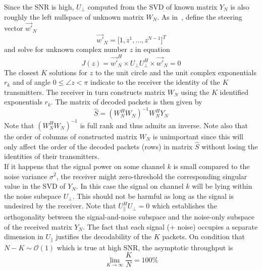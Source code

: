 \documentclass[10pt, a4paper, twocolumn]{IEEEtran}
\begin{document}
\noindent Since the SNR is high, $U_{\bot}$ computed from the SVD of known matrix $Y_N$ is also roughly the left nullspace of unknown matrix $W_N$. As in~\cite{music}, define the steering vector $\overrightarrow{w'}_N$
\begin{equation}
\label{z_steer}
\overrightarrow{w'}_N = \big[1, z^{1}, \dots, z^{N-1}\big]^T
\end{equation}  
\noindent and solve for unknown complex number $z$ in equation
\begin{equation}
J(z) = \overrightarrow{w'}_N^H\times U_{\bot} U_{\bot}^H\times \overrightarrow{w'}_N = 0
\end{equation}
\noindent The closest $K$ solutions for $z$ to the unit circle and the unit complex exponentials $r_k$ and of angle $0\leq \angle z < \pi$ indicate to the receiver the identity of the $K$ transmitters. The receiver in turn constructs matrix $W_N$ using the $K$ identified exponentials $r_k$. The matrix of decoded packets is then given by
\begin{equation}
\hat{S} = (W_N^H W_N)^{-1} W_N^H Y_N
\end{equation}
\noindent Note that $(W_N^H W_N)^{-1}$ is full rank and thus admits an inverse. Note also that the order of columns of constructed matrix $W_N$ is unimportant since this will only affect the order of the decoded packets (rows) in matrix $\hat{S}$ without losing the identities of their transmitters.\\

\noindent If it happens that the signal power on some channel $k$ is small compared to the noise variance $\sigma^2$, the receiver might zero-threshold the corresponding singular value in the SVD of $Y_N$. In this case the signal on channel $k$ will be lying within the noise subspace $U_{\bot}$. This should not be harmful as long as the signal is undesired by the receiver. Note that $U_{\parallel}^H U_{\bot} = 0$ which establishes the orthogonality between the signal-and-noise subspace and the noise-only subspace of the received matrix $Y_N$. The fact that each signal (+ noise) occupies a separate dimension in $U_{\parallel}$ justifies the decodability of the $K$ packets. On condition that $N-K\sim\mathcal{O}(1)$ which is true at high SNR, the asymptotic throughput is
\begin{equation}
\label{throughput}
\lim_{K\rightarrow \infty}\frac{K}{N} = 100\%
\end{equation}
\end{document}
